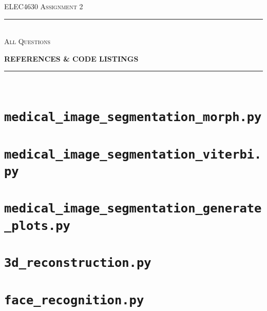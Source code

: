 \begin{titlepage}
  \centering

  \textsc{ELEC4630 Assignment 2}\\
  \vspace{9cm}

  \rule{\linewidth}{0.5pt}\\

  \vspace{1em}
  \LARGE\textsc{All Questions}\\
  \vspace{1em}

  \LARGE\uppercase{\textbf{{References \& Code Listings}}}\\

  \rule{\linewidth}{2pt}\\

  \vfill

\end{titlepage}

\printbibliography

\appendix

\newpage
\section{\texttt{medical\_image\_segmentation\_morph.py}}


\newpage
\section{\texttt{medical\_image\_segmentation\_viterbi.py}}


\newpage
\section{\texttt{medical\_image\_segmentation\_generate\_plots.py}}


\newpage
\section{\texttt{3d\_reconstruction.py}}


\newpage
\section{\texttt{face\_recognition.py}} \label{app:face_recognition_py}

